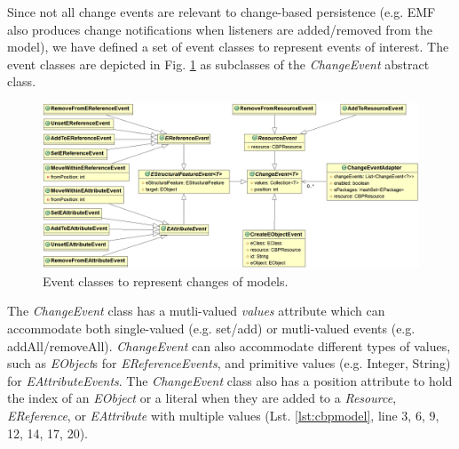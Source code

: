 \documentclass[conference]{IEEEtran}
\begin{document}
Since not all change events are relevant to change-based persistence (e.g. EMF also produces change notifications when listeners are added/removed from the model), we have defined a set of event classes to represent events of interest. The event classes are depicted in Fig. \ref{fig:events} as subclasses of the \emph{ChangeEvent} abstract class.  %

\begin{figure}[htbh]
\centering
\includegraphics[width=\linewidth]{events}
\caption{Event classes to represent changes of models.}
\label{fig:events}
\end{figure}

The \emph{ChangeEvent} class has a mutli-valued \emph{values} attribute which can accommodate both single-valued (e.g. set/add) or mutli-valued events (e.g. addAll/removeAll). \emph{ChangeEvent} can also accommodate different types of values, such as \emph{EObject}s for \emph{EReferenceEvents}, and primitive values (e.g. Integer, String) for \emph{EAttributeEvents}. The \emph{ChangeEvent} class also has a position attribute to hold the  index of an \emph{EObject} or a literal when they are added to a \emph{Resource}, \emph{EReference}, or \emph{EAttribute} with multiple values (Lst. \ref{lst:cbpmodel}, line 3, 6, 9, 12, 14, 17, 20). 

\end{document}
